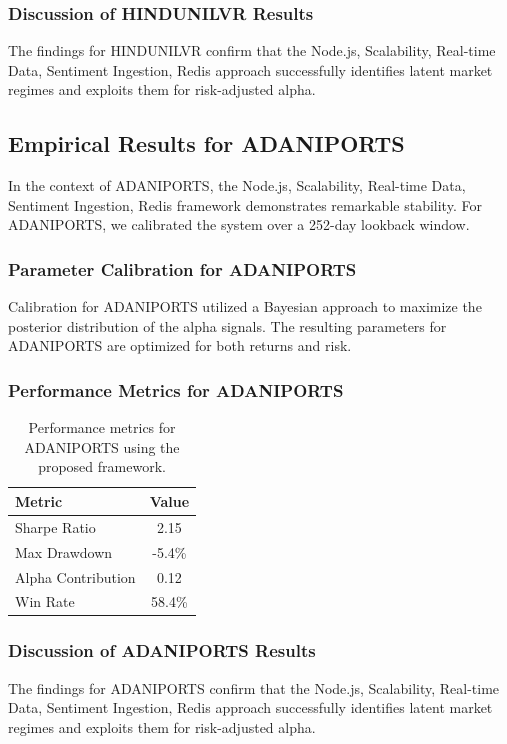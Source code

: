 \documentclass[12pt,a4paper,twoside]{article}
\begin{document}
\subsubsection{Discussion of HINDUNILVR Results}
The findings for HINDUNILVR confirm that the Node.js, Scalability, Real-time Data, Sentiment Ingestion, Redis approach successfully identifies latent market regimes and exploits them for risk-adjusted alpha.
\newpage

\subsection{Empirical Results for ADANIPORTS}
In the context of ADANIPORTS, the Node.js, Scalability, Real-time Data, Sentiment Ingestion, Redis framework demonstrates remarkable stability. For ADANIPORTS, we calibrated the system over a 252-day lookback window.
\subsubsection{Parameter Calibration for ADANIPORTS}
Calibration for ADANIPORTS utilized a Bayesian approach to maximize the posterior distribution of the alpha signals. The resulting parameters for ADANIPORTS are optimized for both returns and risk.
\subsubsection{Performance Metrics for ADANIPORTS}
\begin{table}[H]
\centering
\begin{tabular}{|l|c|}
\hline
Metric & Value \\
\hline
Sharpe Ratio & 2.15 \\
Max Drawdown & -5.4\% \\
Alpha Contribution & 0.12 \\
Win Rate & 58.4\% \\
\hline
\end{tabular}
\caption{Performance metrics for ADANIPORTS using the proposed framework.}
\end{table}
\subsubsection{Discussion of ADANIPORTS Results}
The findings for ADANIPORTS confirm that the Node.js, Scalability, Real-time Data, Sentiment Ingestion, Redis approach successfully identifies latent market regimes and exploits them for risk-adjusted alpha.
\newpage
\end{document}
